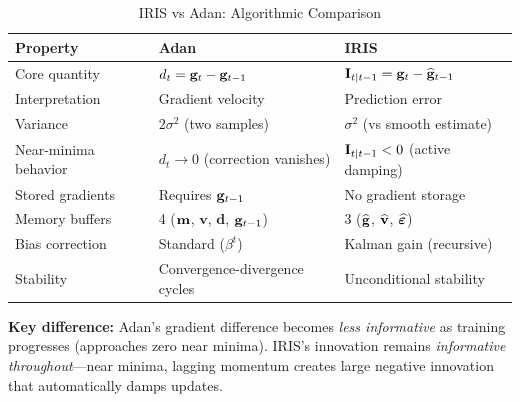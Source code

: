 \begin{table}[h]
\centering
\caption{IRIS vs Adan: Algorithmic Comparison}
\label{tab:iris_vs_adan}
\small
\begin{tabular}{@{}lll@{}}
\toprule
\textbf{Property} & \textbf{Adan} & \textbf{IRIS} \\
\midrule
Core quantity & $d_t = \mathbf{g}_t - \mathbf{g}_{t-1}$ & $\mathbf{I}_{t|t-1} = \mathbf{g}_t - \widehat{\mathbf{g}}_{t-1}$ \\
Interpretation & Gradient velocity & Prediction error \\
Variance & $2\sigma^2$ (two samples) & $\sigma^2$ (vs smooth estimate) \\
Near-minima behavior & $d_t \to 0$ (correction vanishes) & $\mathbf{I}_{t|t-1} < 0$ (active damping) \\
Stored gradients & Requires $\mathbf{g}_{t-1}$ & No gradient storage \\
Memory buffers & 4 ($\mathbf{m}$, $\mathbf{v}$, $\mathbf{d}$, $\mathbf{g}_{t-1}$) & 3 ($\widehat{\mathbf{g}}$, $\widehat{\mathbf{v}}$, $\widehat{\bm{\varepsilon}}$) \\
Bias correction & Standard ($\beta^t$) & Kalman gain (recursive) \\
Stability & Convergence-divergence cycles & Unconditional stability \\
\bottomrule
\end{tabular}
\end{table}

\textbf{Key difference:} Adan's gradient difference becomes \emph{less informative} as training progresses (approaches zero near minima). IRIS's innovation remains \emph{informative throughout}---near minima, lagging momentum creates large negative innovation that automatically damps updates.
